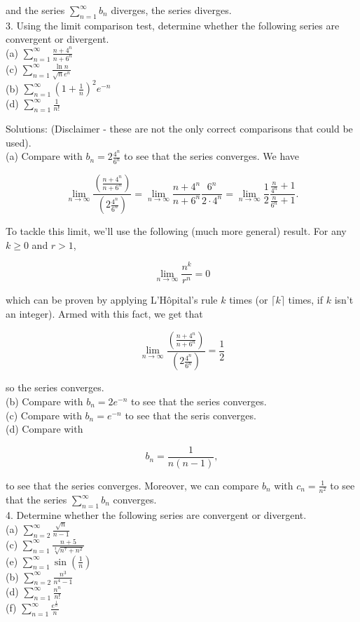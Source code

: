 \documentclass[10pt]{article}
\begin{document}
and the series $\sum_{n=1}^{\infty} b_{n}$ diverges, the series diverges.\\
3. Using the limit comparison test, determine whether the following series are convergent or divergent.\\
(a) $\sum_{n=1}^{\infty} \frac{n+4^{n}}{n+6^{n}}$\\
(c) $\sum_{n=1}^{\infty} \frac{\ln n}{\sqrt{n} e^{n}}$\\
(b) $\sum_{n=1}^{\infty}\left(1+\frac{1}{n}\right)^{2} e^{-n}$\\
(d) $\sum_{n=1}^{\infty} \frac{1}{n!}$

Solutions: (Disclaimer - these are not the only correct comparisons that could be used).\\
(a) Compare with $b_{n}=2 \frac{4^{n}}{6^{n}}$ to see that the series converges. We have

$$
\lim _{n \rightarrow \infty} \frac{\left(\frac{n+4^{n}}{n+6^{n}}\right)}{\left(2 \frac{4^{n}}{6^{n}}\right)}=\lim _{n \rightarrow \infty} \frac{n+4^{n}}{n+6^{n}} \frac{6^{n}}{2 \cdot 4^{n}}=\lim _{n \rightarrow \infty} \frac{1}{2} \frac{\frac{n}{4^{n}}+1}{\frac{n}{6^{n}}+1} .
$$

To tackle this limit, we'll use the following (much more general) result. For any $k \geq 0$ and $r>1$,

$$
\lim _{n \rightarrow \infty} \frac{n^{k}}{r^{n}}=0
$$

which can be proven by applying L'Hôpital's rule $k$ times (or $\lceil k\rceil$ times, if $k$ isn't an integer). Armed with this fact, we get that

$$
\lim _{n \rightarrow \infty} \frac{\left(\frac{n+4^{n}}{n+6^{n}}\right)}{\left(2 \frac{4^{n}}{6^{n}}\right)}=\frac{1}{2}
$$

so the series converges.\\
(b) Compare with $b_{n}=2 e^{-n}$ to see that the series converges.\\
(c) Compare with $b_{n}=e^{-n}$ to see that the seris converges.\\
(d) Compare with

$$
b_{n}=\frac{1}{n(n-1)},
$$

to see that the series converges. Moreover, we can compare $b_{n}$ with $c_{n}=\frac{1}{n^{2}}$ to see that the series $\sum_{n=1}^{\infty} b_{n}$ converges.\\
4. Determine whether the following series are convergent or divergent.\\
(a) $\sum_{n=2}^{\infty} \frac{\sqrt{n}}{n-1}$\\
(c) $\sum_{n=1}^{\infty} \frac{n+5}{\sqrt[3]{n^{7}+n^{2}}}$\\
(e) $\sum_{n=1}^{\infty} \sin \left(\frac{1}{n}\right)$\\
(b) $\sum_{n=2}^{\infty} \frac{n^{3}}{n^{4}-1}$\\
(d) $\sum_{n=1}^{\infty} \frac{n^{n}}{n!}$\\
(f) $\sum_{n=1}^{\infty} \frac{e^{\frac{1}{n}}}{n}$
\end{document}

